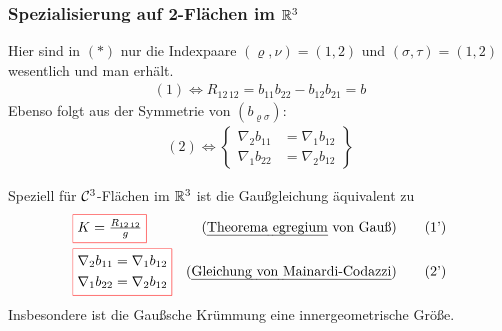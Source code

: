 \subsubsection{Spezialisierung auf 2-Flächen im \(\mathbb{R}^3\)}
Hier sind in \((\ast)\) nur die Indexpaare \((\varrho, \nu) = (1,2)\) und \((\sigma,\tau) = (1,2)\) wesentlich und man erhält.
\begin{align*}
 (1) \Leftrightarrow R_{12\,12} = b_{11}b_{22}-b_{12}b_{21} = b
\end{align*}
Ebenso folgt aus der Symmetrie von \((b_{\varrho \sigma})\):
\begin{align*}
 (2) \Leftrightarrow \begin{Bmatrix}
                      \nabla_2 b_{11} &= \nabla_1 b_{12} \\
                      \nabla_1 b_{22} &= \nabla_2 b_{12}
                     \end{Bmatrix}
\end{align*}
\setcounter{folgnn}{2}
\begin{folgn}
 Speziell für \(\mathcal{C}^3\)-Flächen im \(\mathbb{R}^3\) ist die Gaußgleichung äquivalent zu
 \begin{align*}
  &\fcolorbox{red}{white}{\(K = \frac{R_{12 \, 12}}{g}\)} &\text{(\uline{Theorema egregium} von Gauß)} \tag {1'} \\
  &\fcolorbox{red}{white}{\(\begin{aligned}
           \nabla_2 b_{11} &= \nabla_1 b_{12} \\
           \nabla_1 b_{22} &= \nabla_2 b_{12}
          \end{aligned}\)} &\text{(\uline{Gleichung von Mainardi-Codazzi})} \tag{2'}
 \end{align*}
 Insbesondere ist die Gaußsche Krümmung eine innergeometrische Größe.
\end{folgn}

